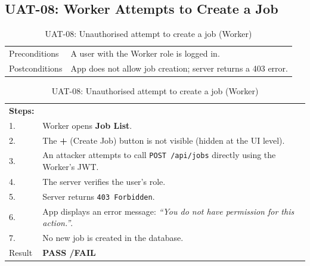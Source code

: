 \subsection*{UAT-08: Worker Attempts to Create a Job}
\begin{table}[H]
  \centering
  \begin{tabularx}{\textwidth}{lX}
    \toprule
    Preconditions  & A user with the Worker role is logged in. \\
    Postconditions & App does not allow job creation; server returns a 403 error. \\
    \midrule
  \end{tabularx}
  \begin{tabularx}{\textwidth}{lX}
    \textbf{Steps:} & \\
    1. & Worker opens \textbf{Job List}. \\
    2. & The \textbf{+} (Create Job) button is not visible (hidden at the UI level). \\
    3. & An attacker attempts to call \texttt{POST /api/jobs} directly using the Worker's JWT. \\
    4. & The server verifies the user's role. \\
    5. & Server returns \texttt{403 Forbidden}. \\
    6. & App displays an error message: \textit{``You do not have permission for this action.''}. \\
    7. & No new job is created in the database. \\
    \midrule
    Result & \textbf{PASS \quad/\quad FAIL} \\
    \bottomrule
  \end{tabularx}
  \caption{UAT-08: Unauthorised attempt to create a job (Worker)}
\end{table}

